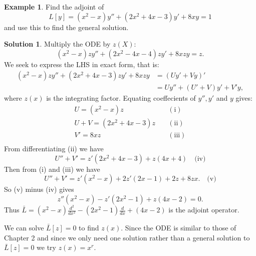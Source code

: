 \documentclass{article}
\theoremstyle{plain}
\theoremstyle{definition}
\newtheorem{exmp}{Example}[section]
\newtheorem*{sol}{Solution}
\numberwithin{equation}{section}
\begin{document}
\begin{tcolorbox}
    \begin{exmp}
        Find the adjoint of 
        \[ L[y] = (x^2 - x)y'' + (2x^2 + 4x - 3)y' + 8xy = 1 \]
        and use this to find the general solution.
    \end{exmp}
    \begin{sol}
        Multiply the ODE by $z(X)$:
        \[(x^2-x)zy'' + (2x^2-4x-4)zy' + 8xzy = z.\]
        We seek to express the LHS in exact form, that is:
        \begin{align*}
            (x^2-x)zy''+(2x^2+4x-3)zy' + 8xzy &= \left( Uy' + Vy\right)' \\
            &= Uy'' + (U'+V)y' + V'y,
        \end{align*}
        where $z(x)$ is the integrating factor.
        Equating coeffecients of $y'', y' $ and $y$ gives:
        \[ \begin{matrix}
            U=(x^2-x)z & \quad (\text{i}) \\
            U + V = ( 2x^2 + 4x - 3)z & \quad (\text{ii}) \\
            V' = 8xz & \quad (\text{iii}) \\
        \end{matrix} \]
        From differentiating (ii) we have
        \[ U'' + V' = z'(2x^2 + 4x - 3) + z(4x+4) \quad \text{(iv)} \]
        Then from (i) and (iii) we have
        \[ U''+V' = z'(x^2-x) + 2z'(2x-1)+2z+8zx. \quad \text{(v)} \]
        So (v) minus (iv) gives
        \[ z''(x^2-x)-z'(2x^2-1) + z(4x-2) = 0. \]
        Thus $\bar{L} = (x^2-x)\frac{d^2}{dx^2} - (2x^2-1)\frac{d}{dx} + (4x-2) $ is the adjoint operator.


        We can solve $\bar{L}[z] = 0$ to find $z(x)$. Since the ODE is similar to those of Chapter 2 and since we only need one solution rather than a general solution to $\bar{L}[z] = 0$ we try $z(x)=x^r$.

    \end{sol}
\end{tcolorbox}
\end{document}
